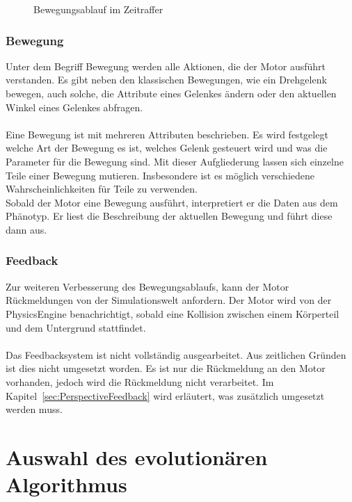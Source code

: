 \begin{figure}[H]
        \caption{Bewegungsablauf im Zeitraffer\label{fig:ConceptMovement}}

      \end{figure}

      \subsubsection{Bewegung\label{subsub:EngineMovement}}

        Unter dem Begriff Bewegung werden alle Aktionen, die der Motor ausführt verstanden.
        Es gibt neben den klassischen Bewegungen, wie ein Drehgelenk bewegen,
        auch solche, die Attribute eines Gelenkes ändern oder den aktuellen Winkel eines Gelenkes abfragen.
        \\
        \\
        Eine Bewegung ist mit mehreren Attributen beschrieben.
        Es wird festgelegt welche Art der Bewegung es ist,
        welches Gelenk gesteuert wird und was die Parameter für die Bewegung sind.
        Mit dieser Aufgliederung lassen sich einzelne Teile einer Bewegung mutieren.
        Insbesondere ist es möglich verschiedene Wahrscheinlichkeiten für Teile zu verwenden.
        \\
        Sobald der Motor eine Bewegung ausführt, interpretiert er die Daten aus dem Phänotyp.
        Er liest die Beschreibung der aktuellen Bewegung und führt diese dann aus.

      \subsubsection{Feedback}

        Zur weiteren Verbesserung des Bewegungsablaufs,
        kann der Motor Rückmeldungen von der Simulationswelt anfordern.
        Der Motor wird von der \gls{PhysicsEngine} benachrichtigt,
        sobald eine Kollision zwischen einem Körperteil und dem Untergrund stattfindet.
        \\
        \\
        Das Feedbacksystem ist nicht vollständig ausgearbeitet.
        Aus zeitlichen Gründen ist dies nicht umgesetzt worden.
        Es ist nur die Rückmeldung an den Motor vorhanden, jedoch wird die Rückmeldung nicht verarbeitet.
        Im Kapitel~\vref{sec:PerspectiveFeedback} wird erläutert, was zusätzlich umgesetzt werden muss.

  \section{Auswahl des evolutionären Algorithmus}

